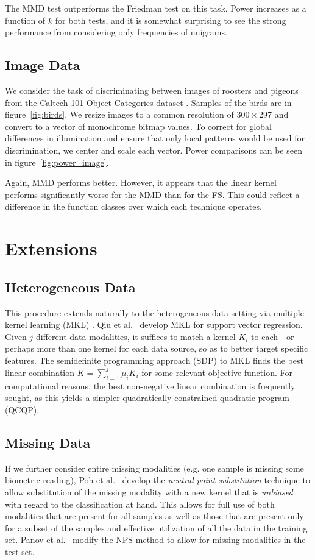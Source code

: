 The MMD test outperforms the Friedman test on this task.  Power
increases as a function of $k$ for both tests, and it is somewhat
surprising to see the strong performance from considering only
frequencies of unigrams.

\subsection{Image Data}
We consider the task of discriminating between images of roosters and
pigeons from the Caltech 101 Object Categories dataset
\cite{fei2007learning}.  Samples of the birds are in figure~\ref{fig:birds}.
We resize images to a common resolution of $300 \times
297$ and convert to a vector of monochrome bitmap values.  
To correct for global differences in illumination and ensure
that only local patterns would be used for discrimination, we center and
scale each vector.  Power comparisons can be seen in figure~\ref{fig:power_image}.

Again, MMD performs better.  However, it appears that the linear
kernel performs significantly worse for the MMD than for the FS.
This could reflect a difference in the function classes over which
each technique operates.  

\section{Extensions}
\subsection{Heterogeneous Data}
This procedure extends naturally to the heterogeneous data setting via
multiple kernel learning (MKL) \cite{lanckriet2004learning,
  gonen2011multiple}.  Qiu et al.\ \cite{qiu2005multiple} develop MKL
for support vector regression.  Given $j$ different data modalities,
it suffices to match a kernel $K_i$ to each---or perhaps more than one
kernel for each data source, so as to better target specific features.
The semidefinite programming approach (SDP) to MKL finds the best
linear combination $K = \sum_{i=1}^j \mu_i K_i$ for some relevant
objective function.  For computational reasons, the best non-negative
linear combination is frequently sought, as this yields a simpler quadratically
constrained quadratic program (QCQP).

\subsection{Missing Data}
If we further consider entire missing modalities (e.g. one sample is
missing some biometric reading), Poh et al.\ \cite{poh2010addressing}
develop the \emph{neutral point substitution} technique to allow
substitution of the missing modality with a new kernel that is
\emph{unbiased} with regard to the classification at hand.  This
allows for full use of both modalities that are present for all
samples as well as those that are present only for a subset of the
samples and effective utilization of all the data in the training set.
Panov et al.\ \cite{panov2011modified} modify the NPS method to allow
for missing modalities in the test set.

